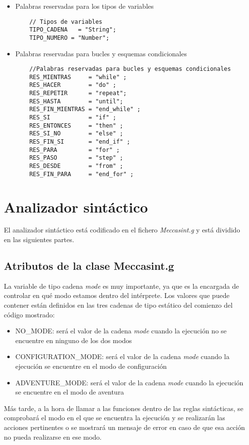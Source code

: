\documentclass[a4paper,12pt,twoside,openright]{report}
\begin{document}
\begin{itemize}
  \item Palabras reservadas para los tipos de variables
  \begin{lstlisting}
    // Tipos de variables
    TIPO_CADENA   = "String";
    TIPO_NUMERO = "Number";
  \end{lstlisting}
  
  \item Palabras reservadas para bucles y esquemas condicionales
  \begin{lstlisting}
    //Palabras reservadas para bucles y esquemas condicionales
    RES_MIENTRAS     = "while" ;
    RES_HACER        = "do" ;
    RES_REPETIR		 = "repeat";
    RES_HASTA        = "until";
    RES_FIN_MIENTRAS = "end_while" ;
    RES_SI           = "if" ;
    RES_ENTONCES     = "then" ;
    RES_SI_NO        = "else" ;
    RES_FIN_SI       = "end_if" ;
    RES_PARA         = "for" ;
    RES_PASO	     = "step" ;
    RES_DESDE        = "from" ;
    RES_FIN_PARA     = "end_for" ;
  \end{lstlisting}


  \end{itemize}

  \section{Analizador sintáctico}
  El analizador sintáctico está codificado en el fichero \emph{Meccasint.g} y está dividido en las siguientes partes.
    \subsection{Atributos de la clase Meccasint.g} %
    
    La variable de tipo cadena \emph{mode} es muy importante, ya que es la encargada de controlar en qué modo estamos 
    dentro del intérprete. Los valores que puede contener están definidos en las tres cadenas de tipo estático del 
    comienzo del código mostrado:
    \begin{itemize}
     \item NO\_MODE: será el valor de la cadena \emph{mode} cuando la ejecución no se encuentre en ninguno de los 
     dos modos
     \item CONFIGURATION\_MODE: será el valor de la cadena \emph{mode} cuando la ejecución se encuentre en el modo de 
     configuración
     \item ADVENTURE\_MODE: será el valor de la cadena \emph{mode} cuando la ejecución se encuentre en el modo de 
     aventura
    \end{itemize}
    Más tarde, a la hora de llamar a las funciones dentro de las reglas sintácticas, se comprobará el modo en el que se encuentra 
    la ejecución y se realizarán las acciones pertinentes o se mostrará un mensaje de error en caso de que esa acción no pueda 
    realizarse en ese modo.
    
\end{document}
